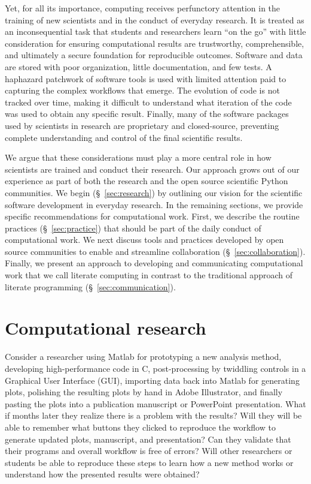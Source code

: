 \documentclass[ChapterTOCs,krantz2]{krantz} %
\begin{document}
Yet, for all its importance, computing receives perfunctory attention in the
training of new scientists and in the conduct of everyday research.  It is
treated as an inconsequential task that students and researchers learn ``on the
go'' with little consideration for ensuring computational results are
trustworthy, comprehensible, and ultimately a secure foundation for
reproducible outcomes.  Software and data are stored with poor organization,
little documentation, and few tests.  A haphazard patchwork of software tools
is used with limited attention paid to capturing the complex workflows that
emerge.  The evolution of code is not tracked over time, making it difficult to
understand what iteration of the code was used to obtain any specific result.
Finally, many of the software packages used by scientists in research are
proprietary and closed-source, preventing complete understanding and control of
the final scientific results.

We argue that these considerations must play a more central role in how
scientists are trained and conduct their research. Our approach grows out of
our experience as part of both the research and the open source scientific
Python communities.  We begin (§~\ref{sec:research}) by outlining our vision
for the scientific software development in everyday research. In the remaining
sections, we provide specific recommendations for computational work.  First,
we describe the routine practices (§~\ref{sec:practice}) that should be part of
the daily conduct of computational work. We next discuss tools and practices
developed by open source communities to enable and streamline collaboration
(§~\ref{sec:collaboration}). Finally, we present an approach to developing and
communicating computational work that we call literate computing in contrast to
the traditional approach of literate programming (§~\ref{sec:communication}).

\section{\label{sec:research}Computational research}

Consider a researcher using Matlab for prototyping a new analysis method,
developing high-performance code in C, post-processing by twiddling controls in
a Graphical User Interface (GUI), importing data back into Matlab for
generating plots, polishing the resulting plots by hand in Adobe Illustrator,
and finally pasting the plots into a publication manuscript or PowerPoint
presentation. What if months later they realize there is a problem with the
results? Will they will be able to remember what buttons they clicked to
reproduce the workflow to generate updated plots, manuscript, and presentation?
Can they validate that their programs and overall workflow is free of errors?
Will other researchers or students be able to reproduce these steps to learn
how a new method works or understand how the presented results were obtained?
\end{document}
